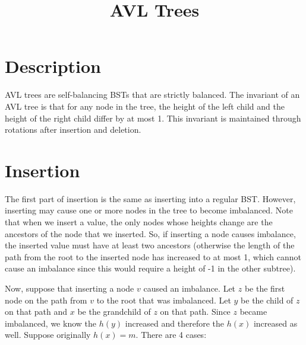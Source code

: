 \documentclass[12pt]{article}
\begin{document}
\title{AVL Trees}
\author{}
\maketitle

\section*{Description}
AVL trees are self-balancing BSTs that are strictly balanced. The invariant of an AVL tree is that for any node in the tree, the height of the left child and the height of the right child differ by at most 1. This invariant is maintained through rotations after insertion and deletion.

\section*{Insertion}
The first part of insertion is the same as inserting into a regular BST. However, inserting may cause one or more nodes in the tree to become imbalanced. Note that when we insert a value, the only nodes whose heights change are the ancestors of the node that we inserted. So, if inserting a node causes imbalance, the inserted value must have at least two ancestors (otherwise the length of the path from the root to the inserted node has increased to at most 1, which cannot cause an imbalance since this would require a height of -1 in the other subtree).

Now, suppose that inserting a node $v$ caused an imbalance. Let $z$ be the first node on the path from $v$ to the root that was imbalanced. Let $y$ be the child of $z$ on that path and $x$ be the grandchild of $z$ on that path. Since $z$ became imbalanced, we know the $h(y)$ increased and therefore the $h(x)$ increased as well. Suppose originally $h(x) = m$. There are 4 cases:
\end{document}
